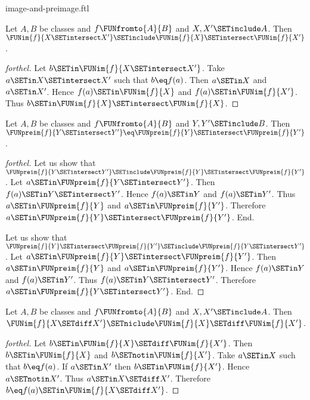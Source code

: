 \documentclass{naproche-library}
\begin{document}
\begin{smodule}[title=Computation Laws for Images and Preimages]{image-and-preimage.ftl}
\begin{proposition}[forthel,id=FOUNDATIONS_07_3966130473402368]
  Let $A, B$ be classes and $f \FUNfromto{A}{B}$ and $X, X' \SETinclude A$.
  Then $\FUNim{f}{X \SETintersect X'} \SETinclude \FUNim{f}{X} \SETintersect \FUNim{f}{X'}$.
\end{proposition}
\begin{proof}[forthel]
  Let $b \SETin \FUNim{f}{X \SETintersect X'}$.
  Take $a \SETin X \SETintersect X'$ such that $b \eq f(a)$.
  Then $a \SETin X$ and $a \SETin X'$.
  Hence $f(a) \SETin \FUNim{f}{X}$ and $f(a) \SETin \FUNim{f}{X'}$.
  Thus $b \SETin \FUNim{f}{X} \SETintersect \FUNim{f}{X}$.
\end{proof}

\begin{proposition}[forthel,id=FOUNDATIONS_07_4021844428455936]
  Let $A, B$ be classes and $f \FUNfromto{A}{B}$ and $Y, Y' \SETinclude B$.
  Then $\FUNpreim{f}{Y \SETintersect Y'} \eq \FUNpreim{f}{Y} \SETintersect \FUNpreim{f}{Y'}$.
\end{proposition}
\begin{proof}[forthel]
  Let us show that $\FUNpreim{f}{Y \SETintersect Y'} \SETinclude \FUNpreim{f}{Y} \SETintersect \FUNpreim{f}{Y'}$.
    Let $a \SETin \FUNpreim{f}{Y \SETintersect Y'}$.
    Then $f(a) \SETin Y \SETintersect Y'$.
    Hence $f(a) \SETin Y$ and $f(a) \SETin Y'$.
    Thus $a \SETin \FUNpreim{f}{Y}$ and $a \SETin \FUNpreim{f}{Y'}$.
    Therefore $a \SETin \FUNpreim{f}{Y} \SETintersect \FUNpreim{f}{Y'}$.
  End.

  Let us show that $\FUNpreim{f}{Y} \SETintersect \FUNpreim{f}{Y'} \SETinclude \FUNpreim{f}{Y \SETintersect Y'}$.
    Let $a \SETin \FUNpreim{f}{Y} \SETintersect \FUNpreim{f}{Y'}$.
    Then $a \SETin \FUNpreim{f}{Y}$ and $a \SETin \FUNpreim{f}{Y'}$.
    Hence $f(a) \SETin Y$ and $f(a) \SETin Y'$.
    Thus $f(a) \SETin Y \SETintersect Y'$.
    Therefore $a \SETin \FUNpreim{f}{Y \SETintersect Y'}$.
  End.
\end{proof}

\begin{proposition}[forthel,id=FOUNDATIONS_07_8372256617005056]
  Let $A, B$ be classes and $f \FUNfromto{A}{B}$ and $X, X' \SETinclude A$.
  Then $\FUNim{f}{X \SETdiff X'} \SETniclude \FUNim{f}{X} \SETdiff \FUNim{f}{X'}$.
\end{proposition}
\begin{proof}[forthel]
  Let $b \SETin \FUNim{f}{X} \SETdiff \FUNim{f}{X'}$.
  Then $b \SETin \FUNim{f}{X}$ and $b \SETnotin \FUNim{f}{X'}$.
  Take $a \SETin X$ such that $b \eq f(a)$.
  If $a \SETin X'$ then $b \SETin \FUNim{f}{X'}$.
  Hence $a \SETnotin X'$.
  Thus $a \SETin X \SETdiff X'$.
  Therefore $b \eq f(a) \SETin \FUNim{f}{X \SETdiff X'}$.
\end{proof}


\end{smodule}
\end{document}
